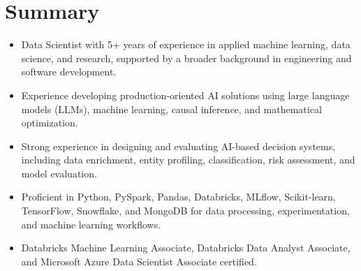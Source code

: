 
\section{Summary}


\begin{itemize}

\setlength{\itemindent}{+.1in}

\item{Data Scientist with 5+ years of experience in applied machine learning, data science, and research, supported by a broader background in engineering and software development.}

\item{Experience developing production-oriented AI solutions using large language models (LLMs), machine learning, causal inference, and mathematical optimization.}

\item{Strong experience in designing and evaluating AI-based decision systems, including data enrichment, entity profiling, classification, risk assessment, and model evaluation.}

\item{Proficient in Python, PySpark, Pandas, Databricks, MLflow, Scikit-learn, TensorFlow, Snowflake, and MongoDB for data processing, experimentation, and machine learning workflows.}

\item{Databricks Machine Learning Associate, Databricks Data Analyst Associate, and Microsoft Azure Data Scientist Associate certified.}

    
\end{itemize}